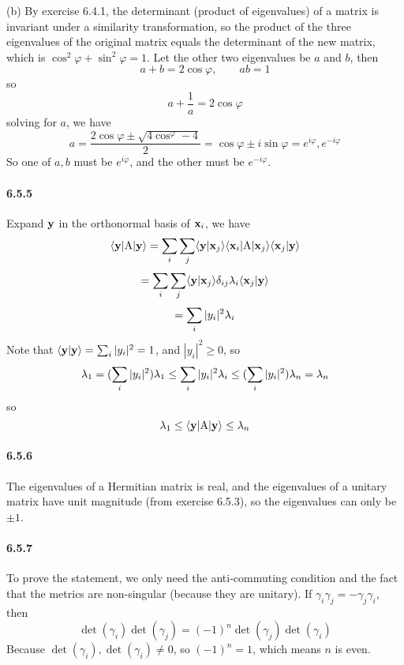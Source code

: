 \documentclass[a4paper]{article}
\begin{document}
(b) By exercise 6.4.1, the determinant (product of eigenvalues) of a matrix is invariant under a similarity transformation, so the product of the three eigenvalues of the original matrix equals the determinant of the new matrix, which is $\cos^2\varphi+\sin^2\varphi=1$. Let the other two eigenvalues be $a$ and $b$, then 
\[
a+b=2\cos\varphi,\qquad ab=1
\]
so
\[
a+\frac{1}{a}=2\cos\varphi
\]
solving for $a$, we have 
\[
a=\frac{2\cos\varphi\pm\sqrt{4\cos^\varphi-4}}{2}=\cos\varphi\pm i\sin\varphi=e^{i\varphi}, e^{-i\varphi}
\]
So one of $a,b$ must be $e^{i\varphi}$, and the other must be $e^{-i\varphi}$.

\paragraph{6.5.5}
Expand $\mathbf{y}$ in the orthonormal basis of $\mathbf{x}_i$, we have
\[
\langle\mathbf{y}|\mathrm{A}|\mathbf{y}\rangle=\sum_i\sum_j\langle\mathbf{y}|\mathbf{x}_j\rangle\langle\mathbf{x}_i|\mathrm{A}|\mathbf{x}_j\rangle\langle\mathbf{x}_j|\mathbf{y}\rangle
\]
\[
=\sum_i\sum_j\langle\mathbf{y}|\mathbf{x}_j\rangle\delta_{ij}\lambda_i\langle\mathbf{x}_j|\mathbf{y}\rangle
\]
\[
=\sum_i|y_i|^2\lambda_i
\]
Note that $\langle\mathbf{y}|\mathbf{y}\rangle=\sum_i|y_i|^2=1$, and $|y_i|^2\geq0$, so
\[
\lambda_1=(\sum_i|y_i|^2)\lambda_1\leq\sum_i|y_i|^2\lambda_i\leq(\sum_i|y_i|^2)\lambda_n=\lambda_n
\]
so
\[
\lambda_1\leq\langle\mathbf{y}|\mathrm{A}|\mathbf{y}\rangle\leq\lambda_n
\]

\paragraph{6.5.6}
The eigenvalues of a Hermitian matrix is real, and the eigenvalues of a unitary matrix have unit magnitude (from exercise 6.5.3), so the eigenvalues can only be $\pm1$.

\paragraph{6.5.7}
To prove the statement, we only need the anti-commuting condition and the fact that the metrics are non-singular (because they are unitary). If $\gamma_i\gamma_j=-\gamma_j\gamma_i$, then 
\[
\det(\gamma_i)\det(\gamma_j)=(-1)^n\det(\gamma_j)\det(\gamma_i)
\]
Because $\det(\gamma_i),\det(\gamma_i)\neq0$, so $(-1)^n=1$, which means $n$ is even.
\medskip
\end{document}
